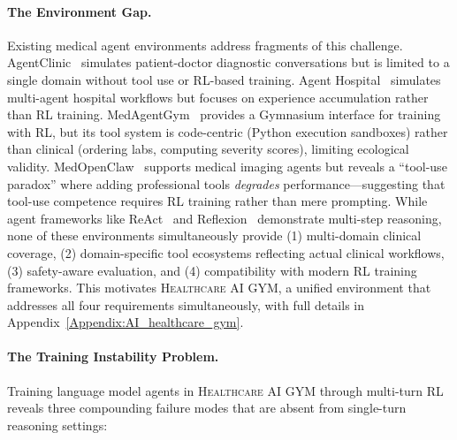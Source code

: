 \documentclass{article}
\newcommand{\gym}{\textsc{Healthcare AI GYM}}
\begin{document}
\paragraph{The Environment Gap.}
Existing medical agent environments address fragments of this challenge. AgentClinic~\citep{schmidgall2025agentclinic} simulates patient-doctor diagnostic conversations but is limited to a single domain without tool use or RL-based training. Agent Hospital~\citep{li2024agenthospital} simulates multi-agent hospital workflows but focuses on experience accumulation rather than RL training. MedAgentGym~\citep{medagentgym2026} provides a Gymnasium interface for training with RL, but its tool system is code-centric (Python execution sandboxes) rather than clinical (ordering labs, computing severity scores), limiting ecological validity. MedOpenClaw~\citep{shen2025medopenclaw} supports medical imaging agents but reveals a ``tool-use paradox'' where adding professional tools \emph{degrades} performance---suggesting that tool-use competence requires RL training rather than mere prompting. While agent frameworks like ReAct~\citep{yao2023react} and Reflexion~\citep{shinn2023reflexion} demonstrate multi-step reasoning, none of these environments simultaneously provide (1) multi-domain clinical coverage, (2) domain-specific tool ecosystems reflecting actual clinical workflows, (3) safety-aware evaluation, and (4) compatibility with modern RL training frameworks. This motivates \gym{}, a unified environment that addresses all four requirements simultaneously, with full details in Appendix~\ref{Appendix:AI_healthcare_gym}.

\paragraph{The Training Instability Problem.}
Training language model agents in \gym{} through multi-turn RL reveals three compounding failure modes that are absent from single-turn reasoning settings:
\end{document}
